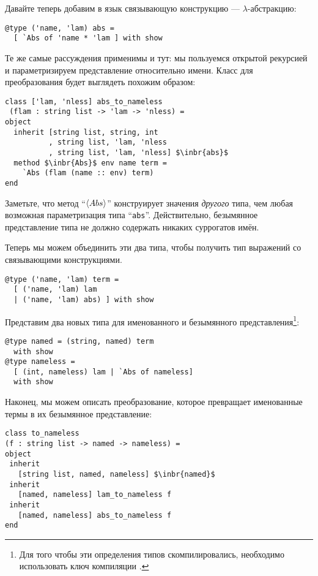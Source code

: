 Давайте теперь добавим в язык связывающую конструкцию --- $\lambda$-абстракцию:

\begin{lstlisting}
@type ('name, 'lam) abs = 
  [ `Abs of 'name * 'lam ] with show
\end{lstlisting}

Те же самые рассуждения применимы и тут: мы пользуемся открытой рекурсией и параметризируем представление относительно имени.
Класс для преобразования будет выглядеть похожим образом:

\begin{lstlisting}
class ['lam, 'nless] abs_to_nameless
 (flam : string list -> 'lam -> 'nless) =
object
  inherit [string list, string, int
          , string list, 'lam, 'nless
          , string list, 'lam, 'nless] $\inbr{abs}$
  method $\inbr{Abs}$ env name term = 
    `Abs (flam (name :: env) term)
end
\end{lstlisting}

Заметьте, что метод ``$\left<Abs\right>$'' конструирует значения \emph{другого} типа, чем любая возможная параметризация типа ``\lstinline{abs}''. Действительно, безымянное представление типа не должно содержать никаких суррогатов имён.

Теперь мы можем объединить эти два типа, чтобы получить тип выражений со связывающими конструкциями.

\begin{lstlisting}
@type ('name, 'lam) term = 
  [ ('name, 'lam) lam 
  | ('name, 'lam) abs) ] with show
\end{lstlisting}

Представим два новых типа для именованного и безымянного представления\footnote{Для того чтобы эти определения типов скомпилировались, необходимо использовать ключ компиляции .}:

\begin{lstlisting}
@type named = (string, named) term 
  with show
@type nameless = 
  [ (int, nameless) lam | `Abs of nameless] 
  with show
\end{lstlisting}

Наконец, мы можем описать преобразование, которое превращает именованные термы в их безымянное представление:

\begin{lstlisting}
class to_nameless
(f : string list -> named -> nameless) = 
object
 inherit 
   [string list, named, nameless] $\inbr{named}$
 inherit 
   [named, nameless] lam_to_nameless f
 inherit 
   [named, nameless] abs_to_nameless f
end
\end{lstlisting}

